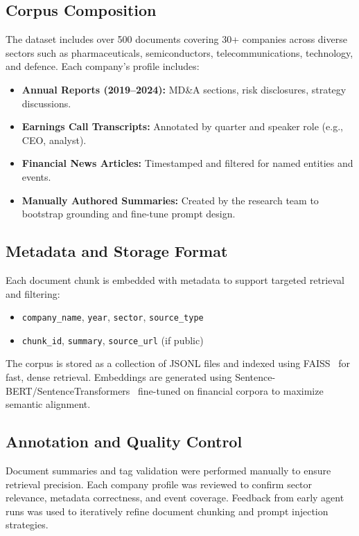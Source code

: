 \documentclass[11pt]{article}
\begin{document}
\subsection*{Corpus Composition}
The dataset includes over 500 documents covering 30+ companies across diverse sectors such as pharmaceuticals, semiconductors, telecommunications, technology, and defence. Each company’s profile includes:
\begin{itemize}
    \item \textbf{Annual Reports (2019–2024):} MD\&A sections, risk disclosures, strategy discussions.
    \item \textbf{Earnings Call Transcripts:} Annotated by quarter and speaker role (e.g., CEO, analyst).
    \item \textbf{Financial News Articles:} Timestamped and filtered for named entities and events.
    \item \textbf{Manually Authored Summaries:} Created by the research team to bootstrap grounding and fine-tune prompt design.
\end{itemize}

\subsection*{Metadata and Storage Format}
Each document chunk is embedded with metadata to support targeted retrieval and filtering:
\begin{itemize}
    \item \texttt{company\_name}, \texttt{year}, \texttt{sector}, \texttt{source\_type}
    \item \texttt{chunk\_id}, \texttt{summary}, \texttt{source\_url} (if public)
\end{itemize}
The corpus is stored as a collection of JSONL files and indexed using FAISS~\citep{johnson2017faiss} for fast, dense retrieval. Embeddings are generated using Sentence-BERT/SentenceTransformers~\citep{reimers2019sentencebert} fine-tuned on financial corpora to maximize semantic alignment.

\subsection*{Annotation and Quality Control}
Document summaries and tag validation were performed manually to ensure retrieval precision. Each company profile was reviewed to confirm sector relevance, metadata correctness, and event coverage. Feedback from early agent runs was used to iteratively refine document chunking and prompt injection strategies.
\end{document}
